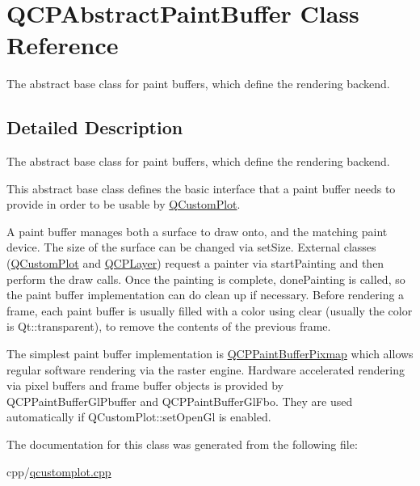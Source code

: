 \hypertarget{class_q_c_p_abstract_paint_buffer}{}\section{Q\+C\+P\+Abstract\+Paint\+Buffer Class Reference}
\label{class_q_c_p_abstract_paint_buffer}


The abstract base class for paint buffers, which define the rendering backend.  




\subsection{Detailed Description}
The abstract base class for paint buffers, which define the rendering backend. 

This abstract base class defines the basic interface that a paint buffer needs to provide in order to be usable by \mbox{\hyperlink{class_q_custom_plot}{Q\+Custom\+Plot}}.

A paint buffer manages both a surface to draw onto, and the matching paint device. The size of the surface can be changed via set\+Size. External classes (\mbox{\hyperlink{class_q_custom_plot}{Q\+Custom\+Plot}} and \mbox{\hyperlink{class_q_c_p_layer}{Q\+C\+P\+Layer}}) request a painter via start\+Painting and then perform the draw calls. Once the painting is complete, done\+Painting is called, so the paint buffer implementation can do clean up if necessary. Before rendering a frame, each paint buffer is usually filled with a color using clear (usually the color is {\ttfamily Qt\+::transparent}), to remove the contents of the previous frame.

The simplest paint buffer implementation is \mbox{\hyperlink{class_q_c_p_paint_buffer_pixmap}{Q\+C\+P\+Paint\+Buffer\+Pixmap}} which allows regular software rendering via the raster engine. Hardware accelerated rendering via pixel buffers and frame buffer objects is provided by Q\+C\+P\+Paint\+Buffer\+Gl\+Pbuffer and Q\+C\+P\+Paint\+Buffer\+Gl\+Fbo. They are used automatically if Q\+Custom\+Plot\+::set\+Open\+Gl is enabled. 

The documentation for this class was generated from the following file\+:\begin{DoxyCompactItemize}
\item 
cpp/\mbox{\hyperlink{qcustomplot_8cpp}{qcustomplot.\+cpp}}\end{DoxyCompactItemize}

